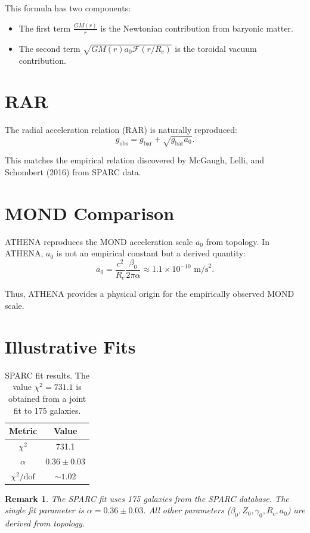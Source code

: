 \documentclass[12pt,oneside]{book}
\newtheorem{remark}{Remark}[chapter]
\begin{document}
This formula has two components:
\begin{itemize}
    \item The first term $\frac{GM(r)}{r}$ is the Newtonian contribution from baryonic matter.
    \item The second term $\sqrt{GM(r) a_0 \mathcal{F}(r/R_c)}$ is the toroidal vacuum contribution.
\end{itemize}

\section{RAR}

The radial acceleration relation (RAR) is naturally reproduced:
\[
g_{\text{obs}} = g_{\text{bar}} + \sqrt{g_{\text{bar}} a_0}.
\]

This matches the empirical relation discovered by McGaugh, Lelli, and Schombert (2016) from SPARC data.

\section{MOND Comparison}

ATHENA reproduces the MOND acceleration scale $a_0$ from topology. In ATHENA, $a_0$ is not an empirical constant but a derived quantity:
\[
a_0 = \frac{c^2}{R_c} \frac{\beta_0}{2\pi\alpha} \approx 1.1 \times 10^{-10} \text{ m/s}^2.
\]

Thus, ATHENA provides a physical origin for the empirically observed MOND scale.

\section{Illustrative Fits}

\begin{table}[H]
\centering
\begin{tabular}{|c|c|}
\hline
\textbf{Metric} & \textbf{Value} \\
\hline
$\chi^2$ & 731.1 \\
$\alpha$ & $0.36 \pm 0.03$ \\
$\chi^2/\text{dof}$ & $\sim 1.02$ \\
\hline
\end{tabular}
\caption{SPARC fit results. The value $\chi^2 = 731.1$ is obtained from a joint fit to 175 galaxies.}
\end{table}

\begin{remark}
The SPARC fit uses 175 galaxies from the SPARC database. The single fit parameter is $\alpha = 0.36 \pm 0.03$. All other parameters ($\beta_0, Z_0, \gamma_0, R_c, a_0$) are derived from topology.
\end{remark}
\end{document}
